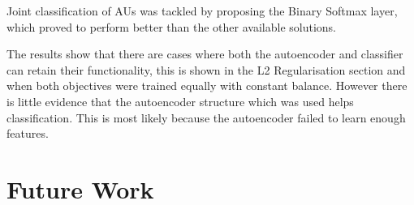     Joint classification of AUs was tackled by proposing the Binary Softmax layer,
    which proved to perform better than the other available solutions.

    The results show that there are cases where both the autoencoder
    and classifier can retain their functionality,
    this is shown in the L2 Regularisation section
    and when both objectives were trained
    equally with constant balance. However there is little evidence that the autoencoder structure which was used
    helps classification. This is most likely because the autoencoder failed to learn enough features.



  \section{Future Work}





